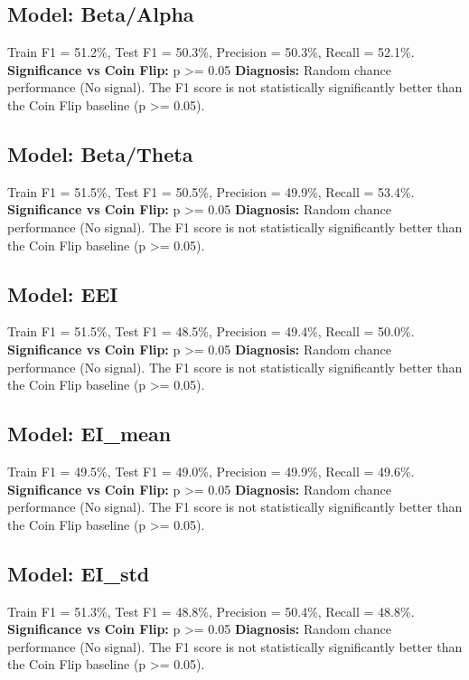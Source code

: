 \subsection*{Model: Beta/Alpha}
Train F1 = 51.2\%, Test F1 = 50.3\%, Precision = 50.3\%, Recall = 52.1\%.
\newline
\textbf{Significance vs Coin Flip:} p >= 0.05
\newline
\textbf{Diagnosis:} Random chance performance (No signal). The F1 score is not statistically significantly better than the Coin Flip baseline (p >= 0.05).

\subsection*{Model: Beta/Theta}
Train F1 = 51.5\%, Test F1 = 50.5\%, Precision = 49.9\%, Recall = 53.4\%.
\newline
\textbf{Significance vs Coin Flip:} p >= 0.05
\newline
\textbf{Diagnosis:} Random chance performance (No signal). The F1 score is not statistically significantly better than the Coin Flip baseline (p >= 0.05).

\subsection*{Model: EEI}
Train F1 = 51.5\%, Test F1 = 48.5\%, Precision = 49.4\%, Recall = 50.0\%.
\newline
\textbf{Significance vs Coin Flip:} p >= 0.05
\newline
\textbf{Diagnosis:} Random chance performance (No signal). The F1 score is not statistically significantly better than the Coin Flip baseline (p >= 0.05).

\subsection*{Model: EI_mean}
Train F1 = 49.5\%, Test F1 = 49.0\%, Precision = 49.9\%, Recall = 49.6\%.
\newline
\textbf{Significance vs Coin Flip:} p >= 0.05
\newline
\textbf{Diagnosis:} Random chance performance (No signal). The F1 score is not statistically significantly better than the Coin Flip baseline (p >= 0.05).

\subsection*{Model: EI_std}
Train F1 = 51.3\%, Test F1 = 48.8\%, Precision = 50.4\%, Recall = 48.8\%.
\newline
\textbf{Significance vs Coin Flip:} p >= 0.05
\newline
\textbf{Diagnosis:} Random chance performance (No signal). The F1 score is not statistically significantly better than the Coin Flip baseline (p >= 0.05).

